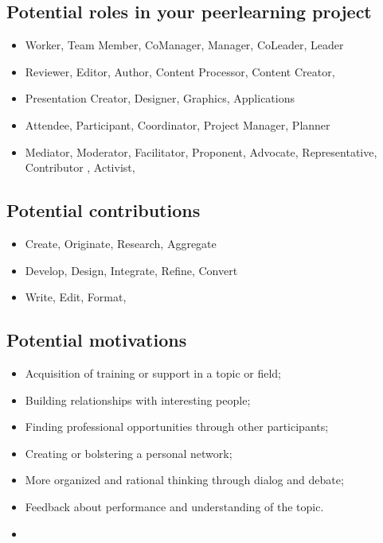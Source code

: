 \subsection{Potential roles in your peer­learning
project}\label{potential-roles-in-your-peerlearning-project}

\begin{itemize}
\tightlist
\item
  Worker, Team Member, Co­Manager, Manager, Co­Leader, Leader
\item
  Reviewer, Editor, Author, Content Processor, Content Creator,
\item
  Presentation Creator, Designer, Graphics, Applications
\item
  Attendee, Participant, Coordinator, Project Manager, Planner
\item
  Mediator, Moderator, Facilitator, Proponent, Advocate, Representative,
  Contributor , Activist,
  {~~~~~~~~~~~~~~~~~~~~~~~~~~~~~~~~~~~~~~~~~~~~~~~~}
\end{itemize}

\subsection{Potential contributions}\label{potential-contributions}

\begin{itemize}
\tightlist
\item
  Create, Originate, Research, Aggregate
\item
  Develop, Design, Integrate, Refine, Convert
\item
  Write, Edit, Format,
  {~~~~~~~~~~~~~~~~~~~~~~~~~~~~~~~~~~~~~~~~~~~~~~~~}
\end{itemize}

\subsection{Potential motivations}\label{potential-motivations}

\begin{itemize}
\tightlist
\item
  Acquisition of training or support in a topic or field;
\item
  Building relationships with interesting people;
\item
  Finding professional opportunities through other participants;
\item
  Creating or bolstering a personal network;
\item
  More organized and rational thinking through dialog and debate;
\item
  Feedback about performance and understanding of the topic.
\item
  {~~~~~~~~~~~~~~~~~~~~~~~~~~~~~~~~~~~~~~~~~~~~~~~~~~~~~~~~~~~~~~~~~~~~~~~~~~~~~~~~~~~~~~~~~~~~~~~~~~~~~~~~~~~~~~~~~~~~~~~~~~~~~~~~}
\end{itemize}

